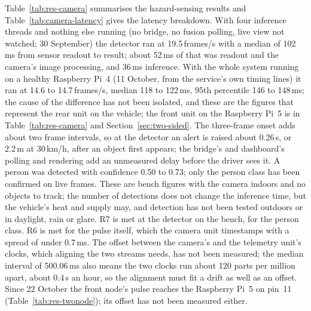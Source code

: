 Table~\ref{tab:res-camera} summarises the hazard-sensing results and Table~\ref{tab:camera-latency} gives the latency breakdown. With four inference threads and nothing else running (no bridge, no fusion polling, live view not watched; 30 September) the detector ran at 19.5\,frames/s with a median of 102\,ms from sensor readout to result; about 52\,ms of that was readout and the camera's image processing, and 36\,ms inference. With the whole system running on a healthy Raspberry Pi~4 (11 October, from the service's own timing lines) it ran at 14.6 to 14.7\,frames/s, median 118 to 122\,ms, 95th percentile 146 to 148\,ms; the cause of the difference has not been isolated, and these are the figures that represent the rear unit on the vehicle; the front unit on the Raspberry Pi~5 is in Table~\ref{tab:res-camera} and Section~\ref{sec:two-sided}. The three-frame onset adds about two frame intervals, so at the detector an alert is raised about 0.26\,s, or 2.2\,m at 30\,km/h, after an object first appears; the bridge's and dashboard's polling and rendering add an unmeasured delay before the driver sees it. A person was detected with confidence 0.50 to 0.73; only the person class has been confirmed on live frames. These are bench figures with the camera indoors and no objects to track; the number of detections does not change the inference time, but the vehicle's heat and supply may, and detection has not been tested outdoors or in daylight, rain or glare. R7 is met at the detector on the bench, for the person class. R6 is met for the pulse itself, which the camera unit timestamps with a spread of under 0.7\,ms. The offset between the camera's and the telemetry unit's clocks, which aligning the two streams needs, has not been measured; the median interval of 500.06\,ms also means the two clocks run about 120 parts per million apart, about 0.4\,s an hour, so the alignment must fit a drift as well as an offset. Since 22 October the front node's pulse reaches the Raspberry Pi~5 on pin~11 (Table~\ref{tab:res-twonode}); its offset has not been measured either.

